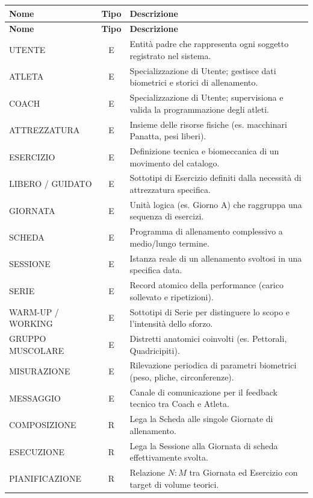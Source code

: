 \documentclass[12pt]{report}
\begin{document}
\begin{longtable}{|l|c|>{\raggedright\arraybackslash}p{8.5cm}|}
\hline
\textbf{Nome} & \textbf{Tipo} & \textbf{Descrizione} \\ \hline
\endfirsthead 

\hline
\textbf{Nome} & \textbf{Tipo} & \textbf{Descrizione} \\ \hline
\endhead 

UTENTE & E & Entità padre che rappresenta ogni soggetto registrato nel sistema. \\ \hline
ATLETA & E & Specializzazione di Utente; gestisce dati biometrici e storici di allenamento. \\ \hline
COACH & E & Specializzazione di Utente; supervisiona e valida la programmazione degli atleti. \\ \hline
ATTREZZATURA & E & Insieme delle risorse fisiche (es. macchinari Panatta, pesi liberi). \\ \hline
ESERCIZIO & E & Definizione tecnica e biomeccanica di un movimento del catalogo. \\ \hline
LIBERO / GUIDATO & E & Sottotipi di Esercizio definiti dalla necessità di attrezzatura specifica. \\ \hline
GIORNATA & E & Unità logica (es. Giorno A) che raggruppa una sequenza di esercizi. \\ \hline
SCHEDA & E & Programma di allenamento complessivo a medio/lungo termine. \\ \hline
SESSIONE & E & Istanza reale di un allenamento svoltosi in una specifica data. \\ \hline
SERIE & E & Record atomico della performance (carico sollevato e ripetizioni). \\ \hline
WARM-UP / WORKING & E & Sottotipi di Serie per distinguere lo scopo e l'intensità dello sforzo. \\ \hline
GRUPPO MUSCOLARE & E & Distretti anatomici coinvolti (es. Pettorali, Quadricipiti). \\ \hline
MISURAZIONE & E & Rilevazione periodica di parametri biometrici (peso, pliche, circonferenze). \\ \hline
MESSAGGIO & E & Canale di comunicazione per il feedback tecnico tra Coach e Atleta. \\ \hline
COMPOSIZIONE & R & Lega la Scheda alle singole Giornate di allenamento. \\ \hline
ESECUZIONE & R & Lega la Sessione alla Giornata di scheda effettivamente svolta. \\ \hline
PIANIFICAZIONE & R & Relazione $N:M$ tra Giornata ed Esercizio con target di volume teorici. \\ \hline

\end{longtable}
\end{document}

